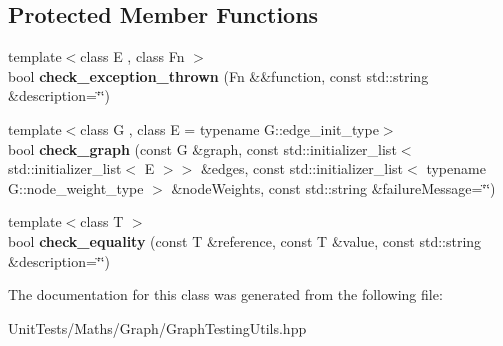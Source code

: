 \subsection*{Protected Member Functions}
\begin{DoxyCompactItemize}
\item 
\mbox{\label{classsequoia_1_1unit__testing_1_1checker__wrapper_a2a1c61112fdd772d59e18dd5d8e7f64c}} 
{\footnotesize template$<$class E , class Fn $>$ }\\bool {\bfseries check\+\_\+exception\+\_\+thrown} (Fn \&\&function, const std\+::string \&description=\char`\"{}\char`\"{})
\item 
\mbox{\label{classsequoia_1_1unit__testing_1_1checker__wrapper_abed9ef11b5d9c574265b24d776ebf7f4}} 
{\footnotesize template$<$class G , class E  = typename G\+::edge\+\_\+init\+\_\+type$>$ }\\bool {\bfseries check\+\_\+graph} (const G \&graph, const std\+::initializer\+\_\+list$<$ std\+::initializer\+\_\+list$<$ E $>$$>$ \&edges, const std\+::initializer\+\_\+list$<$ typename G\+::node\+\_\+weight\+\_\+type $>$ \&node\+Weights, const std\+::string \&failure\+Message=\char`\"{}\char`\"{})
\item 
\mbox{\label{classsequoia_1_1unit__testing_1_1checker__wrapper_aab59186b2d63edb7087c78d18f327760}} 
{\footnotesize template$<$class T $>$ }\\bool {\bfseries check\+\_\+equality} (const T \&reference, const T \&value, const std\+::string \&description=\char`\"{}\char`\"{})
\end{DoxyCompactItemize}


The documentation for this class was generated from the following file\+:\begin{DoxyCompactItemize}
\item 
Unit\+Tests/\+Maths/\+Graph/Graph\+Testing\+Utils.\+hpp\end{DoxyCompactItemize}
